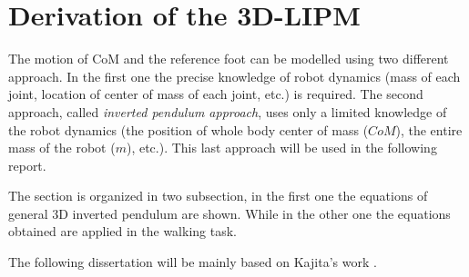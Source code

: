 \section{Derivation of the 3D-LIPM}
The motion of CoM and the reference foot can be modelled using two different approach.
In the first one the precise knowledge of robot dynamics
(mass of each joint, location of center of mass of each joint, etc.) is required.
The second approach, called \emph{inverted pendulum approach},
uses only a limited knowledge of the robot dynamics (the position of whole body center of mass
($CoM$), the entire mass of the robot ($m$), etc.). This last approach will be used in the following
report.
\par
The section is organized in two subsection, in the first one the equations of general 3D inverted
pendulum are shown. While in the other one the equations obtained are applied in the walking task.
\par
The following dissertation will be mainly based on Kajita's work \cite{Kajita2001}.
